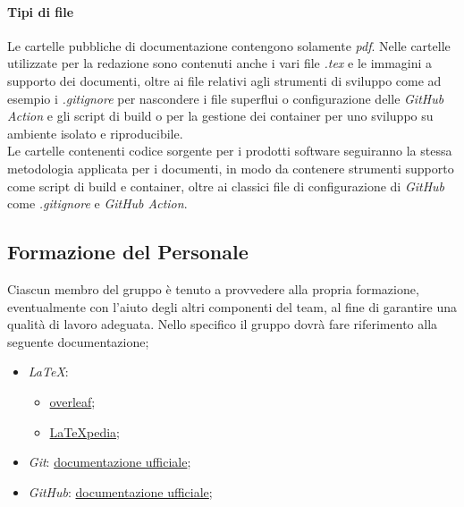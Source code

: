         \paragraph{Tipi di file}
        Le cartelle pubbliche di documentazione contengono solamente \textit{pdf}. Nelle cartelle utilizzate per la redazione sono contenuti anche i vari file \textit{.tex} e le immagini a supporto dei documenti, oltre ai file relativi agli strumenti di sviluppo come ad esempio i \textit{.gitignore} per nascondere i file superflui o configurazione delle \textit{GitHub Action} e gli script di build o per la gestione dei container per uno sviluppo su ambiente isolato e riproducibile. \\
        Le cartelle contenenti codice sorgente per i prodotti software seguiranno la stessa metodologia applicata per i documenti, in modo da contenere strumenti supporto come script di build e container, oltre ai classici file di configurazione di \textit{GitHub} come \textit{.gitignore} e \textit{GitHub Action}.


    \subsection{Formazione del Personale}
        Ciascun membro del gruppo è tenuto a provvedere alla propria formazione, eventualmente con l'aiuto degli altri componenti del team, al fine di garantire una qualità di lavoro adeguata.
        Nello specifico il gruppo dovrà fare riferimento alla seguente documentazione;
                \begin{itemize}
                    \item \textit{LaTeX}:
                        \begin{itemize}
                            \item  \href{https://www.overleaf.com/learn}{overleaf};
                            \item \href{http://www.lorenzopantieri.net/LaTeX_files/LaTeXpedia.pdf}{LaTeXpedia};
                        \end{itemize}
                    \item \textit{Git}: \href{https://git-scm.com/docs}{documentazione ufficiale};
                    \item \textit{GitHub}: \href{https://support.github.com}{documentazione ufficiale};
                \end{itemize}